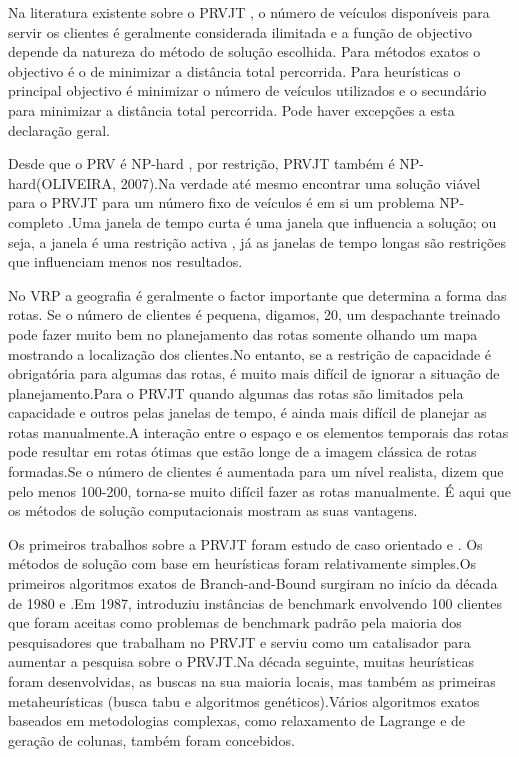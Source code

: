 Na literatura existente sobre o PRVJT , o número de veículos disponíveis para servir os clientes é geralmente considerada ilimitada e a função de objectivo depende da natureza do método de solução escolhida. Para métodos exatos o objectivo é o de minimizar a distância total percorrida. Para heurísticas o principal objectivo é minimizar o número de veículos utilizados e o secundário para minimizar a distância total percorrida. Pode haver excepções a esta declaração geral.



Desde que o PRV é NP-hard , por restrição, PRVJT também é NP-hard(OLIVEIRA, 2007).Na verdade até mesmo encontrar uma solução viável para o PRVJT para um número fixo de veículos é em si um problema NP-completo \cite{savelsbergh95}.Uma janela de tempo curta é uma janela que influencia a solução; ou seja, a janela é uma restrição activa , já as janelas de tempo longas são restrições que influenciam menos nos resultados.



No VRP a geografia é geralmente o factor importante que determina a forma das rotas. Se o número de clientes é pequena, digamos, 20, um despachante treinado pode fazer muito bem no planejamento das rotas somente olhando um mapa mostrando a localização dos clientes.No entanto, se a restrição de capacidade é obrigatória para algumas das rotas, é muito mais difícil de ignorar a situação de planejamento.Para o PRVJT quando algumas das rotas são limitados pela capacidade e outros pelas janelas de tempo, é ainda mais difícil de planejar as rotas manualmente.A interação entre o espaço e os elementos temporais das rotas pode resultar em rotas ótimas que estão longe de a imagem clássica de rotas formadas.Se o número de clientes é aumentada para um nível realista, dizem que pelo menos 100-200, torna-se muito difícil fazer as rotas manualmente. É aqui que os métodos de solução computacionais mostram as suas vantagens\cite{laporte13}.


Os primeiros trabalhos sobre a PRVJT foram estudo de caso orientado \cite{pullen67} e \cite{knight68}. Os métodos de solução com base em heurísticas foram relativamente simples.Os primeiros algoritmos exatos de Branch-and-Bound surgiram no início da década de 1980 \cite{laporte13} e \cite{kolen87}.Em 1987, \cite{solomon87} introduziu instâncias de benchmark envolvendo 100 clientes que foram aceitas como problemas de benchmark padrão pela maioria dos pesquisadores que trabalham no PRVJT e serviu como um catalisador para aumentar a pesquisa sobre o PRVJT.Na década seguinte, muitas heurísticas foram desenvolvidas, as buscas na sua maioria locais, mas também as primeiras metaheurísticas (busca tabu e algoritmos genéticos).Vários algoritmos exatos baseados em metodologias complexas, como relaxamento de Lagrange e de geração de colunas, também foram concebidos.




